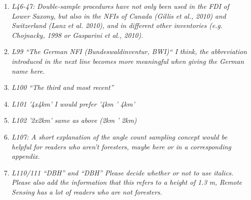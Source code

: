 \documentclass{article}
\begin{document}
\begin{enumerate}
  \item \textit{L46-47: Double-sample procedures have not only been used in the FDI of Lower Saxony, but also in the NFIs of Canada (Gillis et al., 2010) and Switzerland (Lanz et al. 2010), and in different other inventories (e.g. Chojnacky, 1998 or  Gasparini et al., 2010).}
  
  
  \item \textit{L99 “The German NFI (Bundeswaldinventur, BWI)“  I think, the abbreviation introduced in the next line becomes more meaningful when giving the German name here.}
  
  
  \item \textit{L100 “The third and most recent” }
  
  
  \item \textit{L101 '4x4km' I would prefer '4km ' 4km'}
  
  
  \item \textit{L102 '2x2km' same as above (2km ' 2km)}
  
  
  \item \textit{L107: A short explanation of the angle count sampling concept would be helpful for readers who aren't foresters, maybe here or in a corresponding appendix.}
  
  
  \item \textit{L110/111 “DBH” and “DBH” Please decide whether or not to use italics. Please also add the information that this refers to a height of 1.3 m, Remote Sensing has a lot of readers who are not foresters.}
  

\end{enumerate}
\end{document}
